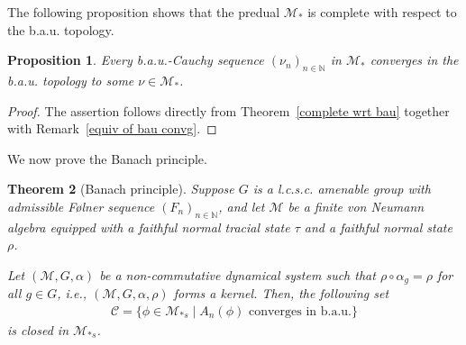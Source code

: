 \documentclass[11pt]{amsart}
\newtheorem{thm}{Theorem}[section]
\newtheorem{prop}[thm]{Proposition}
\theoremstyle{definition}
\theoremstyle{myremark}
\numberwithin{equation}{section}
\def\N{\mathbb N}
\newcommand{\CC}{\mathcal{C}}
\newcommand{\CM}{\mathcal{M}}
\begin{document}
\noindent The following proposition shows that the predual $\CM_*$ is complete with respect to the b.a.u. topology.

\begin{prop}\label{complete wrt bau-functionals}
	Every b.a.u.-Cauchy sequence $(\nu_n)_{n \in \N}$ in $\CM_*$ converges in the b.a.u. topology to some $\nu \in \CM_*$.
\end{prop}

\begin{proof}
	The assertion follows directly from Theorem~\ref{complete wrt bau} together with Remark~\ref{equiv of bau convg}.
\end{proof}



\noindent We now prove the Banach principle.
    	\begin{thm}[Banach principle]\label{Banach principle}
		Suppose $G$ is a \textit{l.c.s.c.} amenable group with admissible F{\o}lner sequence $(F_{n})_{n \in \mathbb{N}}$, and let $\CM$ be a finite von Neumann algebra equipped with a faithful normal tracial state $\tau$ and a faithful normal state $\rho$. 
		
		Let $(\CM, G, \alpha)$ be a non-commutative dynamical system such that $\rho \circ \alpha_g = \rho$ for all $g \in G$, i.e., $(\CM, G, \alpha, \rho)$ forms a kernel. Then, the following set 
		\begin{align*}
			\CC = \{ \phi \in \CM_{*s} \mid A_n(\phi) \text{ converges in b.a.u.} \}
		\end{align*}
		is closed in $\CM_{*s}$.
	\end{thm}
\end{document}
